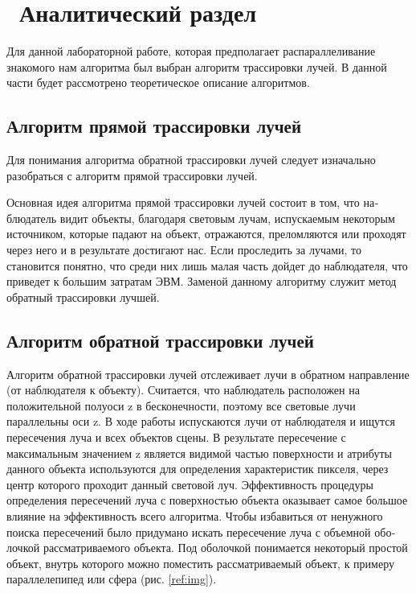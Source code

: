 \chapter{ Аналитический раздел}
\label{cha:analysis}






Для данной лабораторной работе, которая предполагает распараллеливание 
знакомого нам алгоритма был выбран алгоритм трассировки лучей. 
В данной части будет рассмотрено теоретическое описание алгоритмов.

\section{Алгоритм прямой трассировки лучей}

Для понимания алгоритма обратной трассировки лучей следует изначально разобраться с
алгоритм прямой трассировки лучей.

Основная идея алгоритма прямой трассировки лучей состоит в том, что на­блюдатель 
видит объекты, благодаря световым лучам, испускаемым некоторым ис­точником,
которые падают на объект, отражаются, преломляются или проходят че­рез
него и в результате достигают нас. Если проследить за лучами, то становится
понятно, что среди них лишь малая часть дойдет до наблюдателя, что приведет к
большим затратам ЭВМ. Заменой данному алгоритму служит метод обратный трас­сировки лучшей.

\section{Алгоритм обратной трассировки лучей}

Алгоритм обратной трассировки лучей отслеживает лучи в обратном направ­ление (от наблюдателя к объекту).
Считается, что наблюдатель расположен на положительной полуоси z в бес­конечности,
поэтому все световые лучи параллельны оси z. В ходе работы испуска­ются
лучи от наблюдателя и ищутся пересечения луча и всех объектов сцены.
В результате пересечение с максимальным значением z является видимой частью
поверхности и атрибуты данного объекта используются для определения характери­стик
пикселя, через центр которого проходит данный световой луч. Эффективность
процедуры определения пересечений луча с поверхностью объекта оказывает самое
большое влияние на эффективность всего алгоритма. Чтобы избавиться от ненуж­ного
поиска пересечений было придумано искать пересечение луча с объемной обо­лочкой
рассматриваемого объекта. Под оболочкой понимается некоторый простой
объект, внутрь которого можно поместить рассматриваемый объект, к примеру па­раллелепипед или сфера (рис. \ref{ref:img}).

